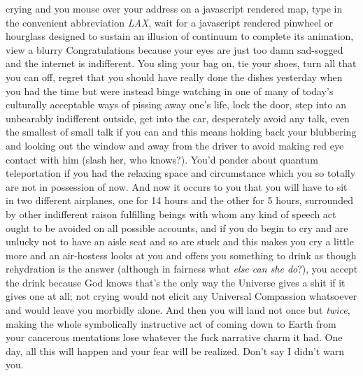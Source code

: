 \documentclass{article}
\begin{document}
crying and you mouse over your address on a javascript rendered map,
type in the convenient abbreviation \textit{LAX}, wait for a javascript
rendered pinwheel or hourglass designed to sustain an illusion of
continuum to complete its animation, view a blurry Congratulations
because your eyes are just too damn sad-sogged and the internet is
indifferent. You sling your bag on, tie your shoes, turn all that you
can off, regret that you should have really done the dishes yesterday
when you had the time but were instead binge watching in one of many of
today's culturally acceptable ways of pissing away one's life, lock the
door, step into an unbearably indifferent outside, get into the
car, desperately avoid any talk, even the smallest of small talk if you
can and this means holding back your blubbering and looking out the
window and away from the driver to avoid making red eye contact with him
(slash her, who knows?). You'd ponder about quantum teleportation if you
had the relaxing space and circumstance which you so totally are not in
possession of now. And now it occurs to you that you will have to sit in
two different airplanes, one for 14 hours and the other for 5 hours,
surrounded by other indifferent raison fulfilling beings with whom any
kind of speech act ought to be avoided on all possible accounts, and if
you do begin to cry and are unlucky not to have an aisle seat and so are
stuck and this makes you cry a little more and an air-hostess looks at
you and offers you something to drink as though rehydration is the
answer (although in fairness what \textit{else can she do}?), you accept
the drink because God knows that's the only way the Universe gives
a shit if it gives one at all; not crying would not elicit any Universal
Compassion whatsoever and would leave you morbidly alone. And then you
will land not once but \textit{twice}, making the whole symbolically
instructive act of coming down to Earth from your cancerous mentations
lose whatever the fuck narrative charm it had. One day, all this will
happen and your fear will be realized. Don't say I didn't warn you.
\end{document}
